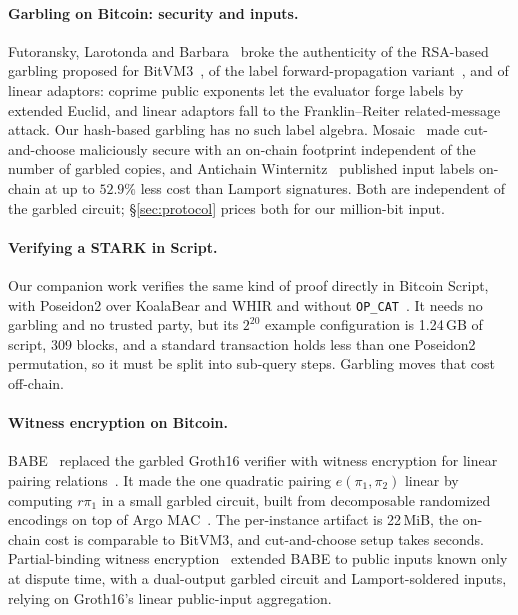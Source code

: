 \documentclass[11pt]{article}
\begin{document}
\paragraph{Garbling on Bitcoin: security and inputs.} Futoransky, Larotonda and
Barbara~\cite{flb25} broke the authenticity of the RSA-based garbling proposed for
BitVM3~\cite{lin25bitvm3}, of the label forward-propagation variant~\cite{fdz25},
and of linear adaptors: coprime public exponents let the evaluator forge labels by
extended Euclid, and linear adaptors fall to the Franklin--Reiter related-message
attack. Our hash-based garbling has no such label algebra. Mosaic~\cite{mosaic26}
made cut-and-choose maliciously secure with an on-chain footprint independent of
the number of garbled copies, and Antichain Winternitz~\cite{antichain26} published
input labels on-chain at up to $52.9\%$ less cost than Lamport signatures. Both
are independent of the garbled circuit; \S\ref{sec:protocol} prices both for our
million-bit input.

\paragraph{Verifying a STARK in Script.} Our companion work verifies the same kind
of proof directly in Bitcoin Script, with Poseidon2 over KoalaBear and WHIR and
without \texttt{OP\_CAT}~\cite{appliedpqcscript}. It needs no garbling and no
trusted party, but its $2^{20}$ example configuration is 1.24\,GB of script, 309
blocks, and a standard transaction holds less than one Poseidon2 permutation, so
it must be split into sub-query steps. Garbling moves that cost off-chain.

\paragraph{Witness encryption on Bitcoin.} BABE~\cite{babe2026} replaced the
garbled Groth16 verifier with witness encryption for linear pairing
relations~\cite{gkpw24}. It made the one quadratic pairing $e(\pi_1,\pi_2)$ linear
by computing $r\pi_1$ in a small garbled circuit, built from decomposable
randomized encodings on top of Argo MAC~\cite{el26argo}. The per-instance artifact
is 22\,MiB, the on-chain cost is comparable to BitVM3, and cut-and-choose setup
takes seconds. Partial-binding witness encryption~\cite{goatpbwe} extended BABE to
public inputs known only at dispute time, with a dual-output garbled circuit and
Lamport-soldered inputs, relying on Groth16's linear public-input aggregation.
\end{document}
